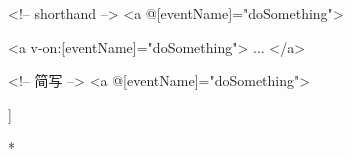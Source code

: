 \begin{paracol}{2}
\begin{codeHtml}
<!-- shorthand -->
<a @[eventName]="doSomething">
\end{codeHtml}  
\switchcolumn
\begin{codeHtml}
<a v-on:[eventName]="doSomething"> ... </a>

<!-- 简写 -->
<a @[eventName]="doSomething">
\end{codeHtml}  
\end{paracol}

]%
\begin{vueQuote}
\end{vueQuote} 

\switchcolumn[0]*%
\begin{codeHtml}

\end{codeHtml}  
\switchcolumn
\begin{codeHtml}

\end{codeHtml}  